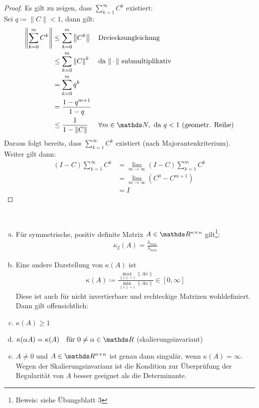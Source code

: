 \begin{proof}
  Es gilt zu zeigen, dass $\sum_{k=1}^{\infty}C^k$ existiert: \\
  Sei $q\coloneqq \|C\| < 1$, dann gilt: 
  \begin{align*}
    \nn{ \sum_{k=0}^{m} C^k } &\leq \sum_{k=0}^{m} \nn{C^k }  && \text{Dreiecksungleichung} \\
                              &\leq \sum_{k=0}^{m}\nn{C}^k && \text{da $\nn{\,\cdot\,}$ submultiplikativ}\\
                              &=\sum_{k=0}^{m}q^k  \\
                              &= \frac{1-q^{m+1}}{1-q} \\
                              &\leq \frac{1}{1-\nn{C}} && \forall m\in \N, \text{ da } q<1 \text{ (geometr. Reihe)}
  \end{align*}
  Daraus folgt bereits, dass $\sum_{k=1}^{\infty}C^k$ existiert (nach Majorantenkriterium).\\
  Weiter gilt dann:
  \begin{align*}
    (I-C) \sum_{k=1}^{\infty}C^k &= \lim\limits_{m\rightarrow \infty}(I-C)   \sum_{k=1}^{m}C^k \\
                                 &= \lim\limits_{m\rightarrow \infty} (C^0-C^{m+1}) \\
                                 &=I 
  \end{align*}
\end{proof}

\begin{Beme}
  \label{3.2.13}~
  \begin{enumerate}[a)]
  \item Für symmetrische, positiv definite Matrix $A\in \Renn$ gilt\footnote{Beweis: siehe Übungsblatt 3}: 
    \begin{gather}
      \kappa_2(A) = \frac{\lambda_{max}}{\lambda_{min}} \label{III.2.13}
    \end{gather}
  \item Eine andere Darstellung von $\kappa(A)$ ist
    \begin{gather}
      \kappa(A) \coloneqq 
      \frac{\underset{\|x\|=1}{\max}\|Ax\|}{\underset{\|x\|=1}{\min}\|Ax\|} \in  \left[ 0, \infty \right]
      \label{III.2.14}
    \end{gather}
    Diese ist auch für nicht invertierbare und rechteckige Matrizen wohldefiniert. \\
    Dann gilt offensichtlich:
  \item $\kappa(A) \geq 1$
  \item $\kappa(\alpha A)=\kappa(A) \quad \text{für } 0\neq\alpha\in\R$ (skalierungsinvariant)
  \item $A\neq 0$ und $A\in\Renn $ ist genau dann singulär, wenn $\kappa(A)=\infty$. \\
    Wegen der Skalierungsinvarianz ist die Kondition zur Überprüfung der Regularität von $A$ 
    besser geeignet als die Determinante.
  \end{enumerate}
\end{Beme}


